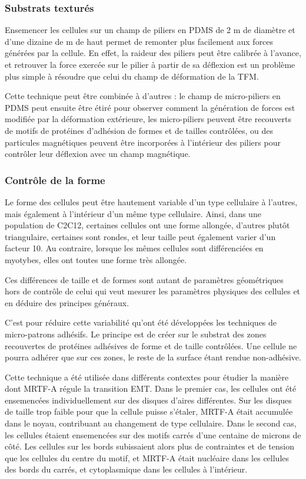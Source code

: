 \subsubsection{Substrats texturés}

Ensemencer les cellules sur un champ de piliers en PDMS de 2 \micro m de diamètre et d'une dizaine de \micro m de haut permet de remonter plus facilement aux forces générées par la cellule. 
En effet, la raideur des piliers peut être calibrée à l'avance, et retrouver la force exercée sur le pilier à partir de sa déflexion est un problème plus simple à résoudre que celui du champ de déformation de la TFM. 

Cette technique peut être combinée à d'autres : le champ de micro-piliers en PDMS peut ensuite être étiré pour observer comment la génération de forces est modifiée par la déformation extérieure, les micro-piliers peuvent être recouverts de motifs de protéines d'adhésion de formes et de tailles contrôlées, ou des particules magnétiques peuvent être incorporées à l'intérieur des piliers pour contrôler leur déflexion avec un champ magnétique. 

\subsubsection{Contrôle de la forme}

Le forme des cellules peut être hautement variable d'un type cellulaire à l'autres, mais également à l'intérieur d'un même type cellulaire. 
Ainsi, dans une population de C2C12, certaines cellules ont une forme allongée, d'autres plutôt triangulaire, certaines sont rondes, et leur taille peut également varier d'un facteur 10. Au contraire, lorsque les mêmes cellules sont différenciées en myotybes, elles ont toutes une forme très allongée. 

Ces différences de taille et de formes sont autant de paramètres géométriques hors de contrôle de celui qui veut mesurer les paramètres physiques des cellules et en déduire des principes généraux. 

C'est pour réduire cette variabilité qu'ont été développées les techniques de micro-patrons adhésifs. 
Le principe est de créer sur le substrat des zones recouvertes de protéines adhésives de forme et de taille contrôlées.
Une cellule ne pourra adhérer que sur ces zones, le reste de la surface étant rendue non-adhésive. 

Cette technique a été utilisée dans différents contextes pour étudier la manière dont MRTF-A régule la transition EMT. 
Dans le premier cas, les cellules ont été ensemencées individuellement sur des disques d'aires différentes. Sur les disques de taille trop faible pour que la cellule puisse s'étaler, MRTF-A était accumulée dans le noyau, contribuant au changement de type cellulaire. 
Dans le second cas, les cellules étaient ensemencées sur des motifs carrés d'une centaine de microns de côté. Les cellules sur les bords subissaient alors plus de contraintes et de tension que les cellules du centre du motif, et MRTF-A était nucléaire dans les cellules des bords du carrés, et cytoplasmique dans les cellules à l'intérieur.

